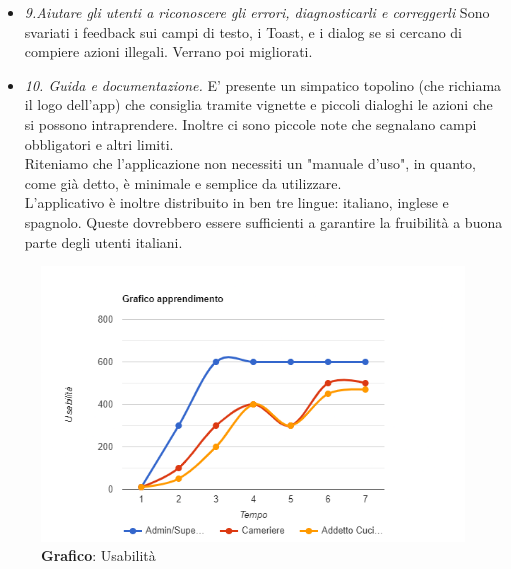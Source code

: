 \begin{flushleft}
\begin{itemize}
            \item \emph{9.Aiutare gli utenti a riconoscere gli errori, diagnosticarli e correggerli} Sono svariati i feedback sui campi di testo, i Toast, e i dialog se si cercano di compiere azioni illegali. Verrano poi migliorati.
            \item  \emph{10. Guida e documentazione.} E' presente un simpatico topolino (che richiama il logo dell'app) che consiglia tramite vignette e piccoli dialoghi le azioni che si possono intraprendere. Inoltre ci sono piccole note che segnalano campi obbligatori e altri limiti.\\
            Riteniamo che l'applicazione non necessiti un "manuale d'uso", in quanto, come già detto, è minimale e semplice da utilizzare.\\
            L'applicativo è inoltre distribuito in ben tre lingue: italiano, inglese e spagnolo. Queste dovrebbero essere sufficienti a garantire la fruibilità a buona parte degli utenti italiani.
            
        \end{itemize}
    \end{flushleft}

    \begin{figure}[H]
        \centering
        \includegraphics[scale=0.6]{assets/immagini varie/grafico usabilita.png}
        \caption{\textbf{Grafico}: Usabilità}\label{fig:Usabilità_graph}
    \end{figure}
    \vspace{0.5cm}
